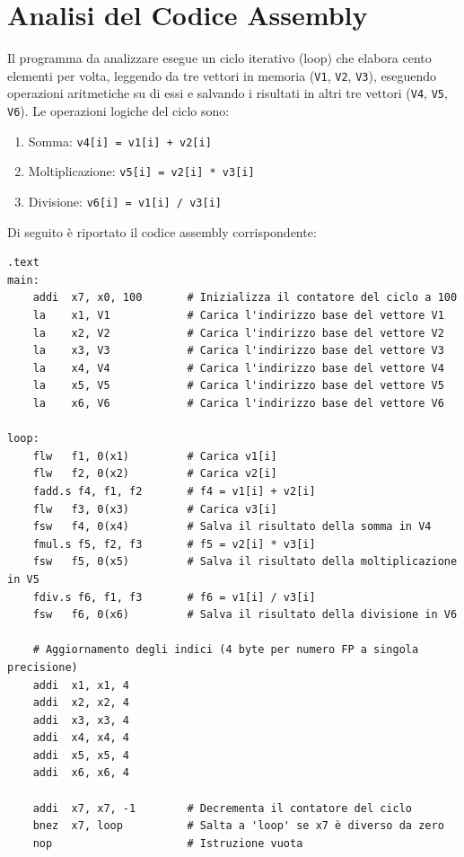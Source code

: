 \section{Analisi del Codice Assembly}

Il programma da analizzare esegue un ciclo iterativo (loop) che elabora cento elementi per volta, leggendo da tre vettori in memoria (\texttt{V1}, \texttt{V2}, \texttt{V3}), eseguendo operazioni aritmetiche su di essi e salvando i risultati in altri tre vettori (\texttt{V4}, \texttt{V5}, \texttt{V6}). Le operazioni logiche del ciclo sono:
\begin{enumerate}
    \item Somma: \texttt{v4[i] = v1[i] + v2[i]}
    \item Moltiplicazione: \texttt{v5[i] = v2[i] * v3[i]}
    \item Divisione: \texttt{v6[i] = v1[i] / v3[i]}
\end{enumerate}

Di seguito è riportato il codice assembly corrispondente:

\begin{verbatim}
.text
main:
    addi  x7, x0, 100       # Inizializza il contatore del ciclo a 100
    la    x1, V1            # Carica l'indirizzo base del vettore V1
    la    x2, V2            # Carica l'indirizzo base del vettore V2
    la    x3, V3            # Carica l'indirizzo base del vettore V3
    la    x4, V4            # Carica l'indirizzo base del vettore V4
    la    x5, V5            # Carica l'indirizzo base del vettore V5
    la    x6, V6            # Carica l'indirizzo base del vettore V6

loop:
    flw   f1, 0(x1)         # Carica v1[i]
    flw   f2, 0(x2)         # Carica v2[i]
    fadd.s f4, f1, f2       # f4 = v1[i] + v2[i]
    flw   f3, 0(x3)         # Carica v3[i]
    fsw   f4, 0(x4)         # Salva il risultato della somma in V4
    fmul.s f5, f2, f3       # f5 = v2[i] * v3[i]
    fsw   f5, 0(x5)         # Salva il risultato della moltiplicazione in V5
    fdiv.s f6, f1, f3       # f6 = v1[i] / v3[i]
    fsw   f6, 0(x6)         # Salva il risultato della divisione in V6
    
    # Aggiornamento degli indici (4 byte per numero FP a singola precisione)
    addi  x1, x1, 4         
    addi  x2, x2, 4         
    addi  x3, x3, 4         
    addi  x4, x4, 4         
    addi  x5, x5, 4         
    addi  x6, x6, 4         
    
    addi  x7, x7, -1        # Decrementa il contatore del ciclo
    bnez  x7, loop          # Salta a 'loop' se x7 è diverso da zero
    nop                     # Istruzione vuota
\end{verbatim}

